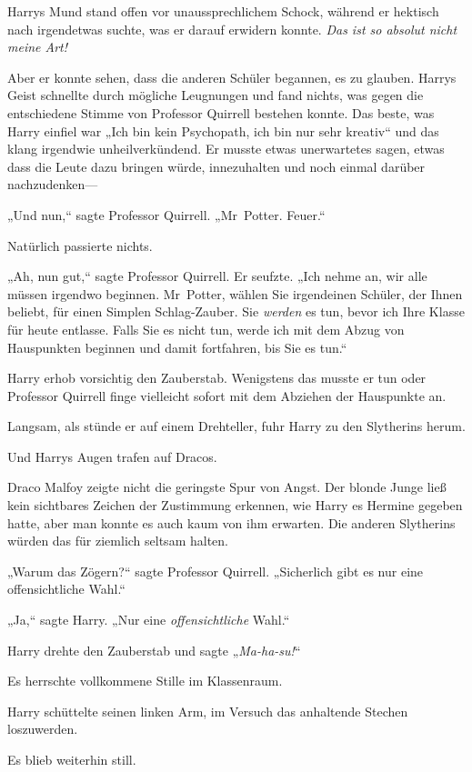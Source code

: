 {Harrys Mund stand offen vor unaussprechlichem Schock, während er hektisch nach irgendetwas suchte, was er darauf erwidern konnte. \emph{Das ist so absolut nicht meine Art!}

Aber er konnte sehen, dass die anderen Schüler begannen, es zu glauben. Harrys Geist schnellte durch mögliche Leugnungen und fand nichts, was gegen die entschiedene Stimme von Professor Quirrell bestehen konnte. Das beste, was Harry einfiel war „Ich bin kein Psychopath, ich bin nur sehr kreativ“ und das klang irgendwie unheilverkündend. Er musste etwas unerwartetes sagen, etwas dass die Leute dazu bringen würde, innezuhalten und noch einmal darüber nachzudenken—

„Und nun,“ sagte Professor Quirrell. „Mr~Potter. Feuer.“

Natürlich passierte nichts.

„Ah, nun gut,“ sagte Professor Quirrell. Er seufzte. „Ich nehme an, wir alle müssen irgendwo beginnen. Mr~Potter, wählen Sie irgendeinen Schüler, der Ihnen beliebt, für einen Simplen Schlag-Zauber. Sie \emph{werden} es tun, bevor ich Ihre Klasse für heute entlasse. Falls Sie es nicht tun, werde ich mit dem Abzug von Hauspunkten beginnen und damit fortfahren, bis Sie es tun.“

Harry erhob vorsichtig den Zauberstab. Wenigstens das musste er tun oder Professor Quirrell finge vielleicht sofort mit dem Abziehen der Hauspunkte an.

Langsam, als stünde er auf einem Drehteller, fuhr Harry zu den Slytherins herum.

Und Harrys Augen trafen auf Dracos.

Draco Malfoy zeigte nicht die geringste Spur von Angst. Der blonde Junge ließ kein sichtbares Zeichen der Zustimmung erkennen, wie Harry es Hermine gegeben hatte, aber man konnte es auch kaum von ihm erwarten. Die anderen Slytherins würden das für ziemlich seltsam halten.

„Warum das Zögern?“ sagte Professor Quirrell. „Sicherlich gibt es nur eine offensichtliche Wahl.“

„Ja,“ sagte Harry. „Nur eine \emph{offensichtliche} Wahl.“

Harry drehte den Zauberstab und sagte „\emph{Ma-ha-su!}“

Es herrschte vollkommene Stille im Klassenraum.

Harry schüttelte seinen linken Arm, im Versuch das anhaltende Stechen loszuwerden.

Es blieb weiterhin still.

}
